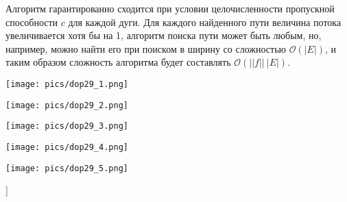 Алгоритм гарантированно сходится при условии целочисленности пропускной способности $c$ для каждой дуги. Для каждого найденного пути величина потока увеличивается хотя бы на 1, алгоритм поиска пути может быть любым, но, например, можно найти его при поиском в ширину со сложностью $\mathcal{O}(|E|)$, и таким образом сложность алгоритма будет составлять $\mathcal{O}(||f||~|E|)$.

\texttt{[image: pics/dop29\_1.png]}

\texttt{[image: pics/dop29\_2.png]}

\texttt{[image: pics/dop29\_3.png]}

\texttt{[image: pics/dop29\_4.png]}

\texttt{[image: pics/dop29\_5.png]}

\bigbreak
[\cite[page 69-96]{replace_me}]